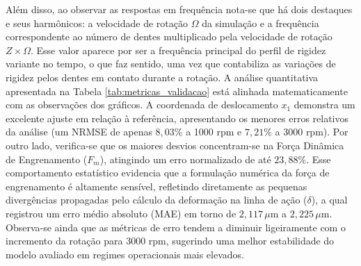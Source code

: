 Além disso, ao observar as respostas em  frequência nota-se que há dois destaques e seus harmônicos: a velocidade de rotação $\Omega$ da simulação e a frequência correspondente ao  número de dentes multiplicado pela velocidade de rotação $Z\times\Omega$. Esse valor aparece por ser a frequência principal do perfil de rigidez variante no  tempo, o que faz sentido, uma vez que contabiliza as variações de rigidez pelos dentes em contato durante a rotação.
\newpage
A análise quantitativa apresentada na Tabela \ref{tab:metricas_validacao} está alinhada matematicamente com as observações dos gráficos. A coordenada de deslocamento $x_1$ demonstra um excelente ajuste em relação à referência, apresentando os menores erros relativos da análise (um NRMSE de apenas $8,03\%$ a 1000 rpm e $7,21\%$ a 3000 rpm). Por outro lado, verifica-se que os maiores desvios concentram-se na Força Dinâmica de Engrenamento ($F_m$), atingindo um erro normalizado de até $23,88\%$. Esse comportamento estatístico evidencia que a formulação numérica da força de engrenamento é altamente sensível, refletindo diretamente as pequenas divergências propagadas pelo cálculo da deformação na linha de ação ($\delta$), a qual registrou um erro médio absoluto (MAE) em torno de $2,117\,\mu\text{m}$ a $2,225\,\mu\text{m}$. Observa-se ainda que as métricas de erro tendem a diminuir ligeiramente com o incremento da rotação para 3000 rpm, sugerindo uma melhor estabilidade do modelo avaliado em regimes operacionais mais elevados.
